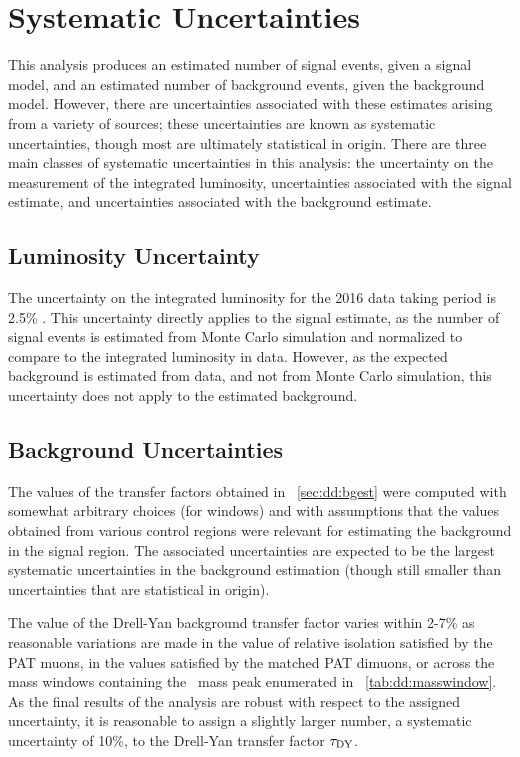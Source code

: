 \section{Systematic Uncertainties}
\label{sec:dd:systunc}
This analysis produces an estimated number of signal events, given a signal model, and an estimated number of background events, given the background model.
However, there are uncertainties associated with these estimates arising from a variety of sources; these uncertainties are known as systematic uncertainties, though most are ultimately statistical in origin.
There are three main classes of systematic uncertainties in this analysis: the uncertainty on the measurement of the integrated luminosity, uncertainties associated with the signal estimate, and uncertainties associated with the background estimate.

\pagebreak
\subsection{Luminosity Uncertainty}
The uncertainty on the integrated luminosity for the 2016 data taking period is 2.5\% \cite{CMS-PAS-LUM-17-001}.
This uncertainty directly applies to the signal estimate, as the number of signal events is estimated from Monte Carlo simulation and normalized to compare to the integrated luminosity in data.
However, as the expected background is estimated from data, and not from Monte Carlo simulation, this uncertainty does not apply to the estimated background.

\subsection{Background Uncertainties}
\label{sec:dd:bgunc}
The values of the transfer factors obtained in \Sec~\ref{sec:dd:bgest} were computed with somewhat arbitrary choices (\eg for \LxySig windows) and with assumptions that the values obtained from various control regions were relevant for estimating the background in the signal region.
The associated uncertainties are expected to be the largest systematic uncertainties in the background estimation (though still smaller than uncertainties that are statistical in origin).

The value of the Drell-Yan background transfer factor varies within 2-7\% as reasonable variations are made in the value of relative isolation satisfied by the PAT muons, in the \LxySig values satisfied by the matched PAT dimuons, or across the mass windows containing the \PZ\ mass peak enumerated in \Tab~\ref{tab:dd:masswindow}.
As the final results of the analysis are robust with respect to the assigned uncertainty, it is reasonable to assign a slightly larger number, a systematic uncertainty of 10\%, to the Drell-Yan transfer factor $\tau_\text{DY}$.

